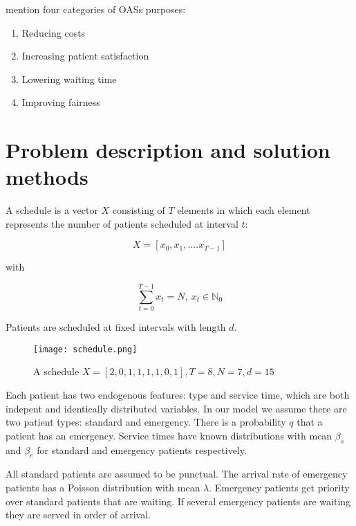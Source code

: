 \documentclass[
  10pt,
  letterpaper,
]{article}
\begin{document}
\citep{ala_appointment_2022} mention four categories of OASs purposes:

\begin{enumerate}
\def\labelenumi{\arabic{enumi}.}
\item
  Reducing costs
\item
  Increasing patient satisfaction
\item
  Lowering waiting time
\item
  Improving fairness
\end{enumerate}

\hypertarget{problem-description-and-solution-methods}{%
\section{Problem description and solution
methods}\label{problem-description-and-solution-methods}}

A schedule is a vector \(X\) consisting of \(T\) elements in which each
element represents the number of patients scheduled at interval \(t\):

\[
X = [x_0, x_1, ....x_{T-1}]
\]

with

\[
\displaystyle\sum_{t=0} ^{T-1} x_t = N,\ x_t \in \mathbb{N}_0
\]

Patients are scheduled at fixed intervals with length \(d\).

\begin{figure}

{\centering \texttt{[image: schedule.png]}

}

\caption{A schedule
\(X = [2, 0, 1, 1, 1, 1, 0, 1], T = 8, N = 7, d = 15\)}

\end{figure}

Each patient has two endogenous features: type and service time, which
are both indepent and identically distributed variables. In our model we
assume there are two patient types: standard and emergency. There is a
probability \(q\) that a patient has an emergency. Service times have
known distributions with mean \(\beta_s\) and \(\beta_e\) for standard
and emergency patients respectively.

All standard patients are assumed to be punctual. The arrival rate of
emergency patients has a Poisson distribution with mean \(\lambda\).
Emergency patients get priority over standard patients that are waiting.
If several emergency patients are waiting they are served in order of
arrival.
\end{document}
